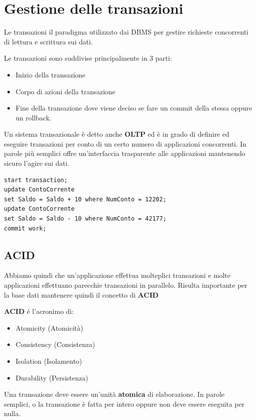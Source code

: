 \chapter{Gestione delle transazioni}

Le transazioni il paradigma utilizzato dai DBMS per gestire richieste concorrenti di lettura e scrittura sui dati.

Le transazioni sono suddivise principalmente in 3 parti:
\begin{itemize}
    \item Inizio della transazione
    \item Corpo di azioni della transazione
    \item Fine della transazione dove viene deciso se fare un commit della stessa oppure un rollback.
\end{itemize}

Un sistema transazionale è detto anche \textbf{OLTP} ed è in grado di definire ed eseguire transazioni per conto di un certo numero di applicazioni concorrenti. In parole più semplici offre un'interfaccia trasparente alle applicazioni mantenendo sicuro l'agire sui dati.

\begin{lstlisting}
start transaction;
update ContoCorrente
set Saldo = Saldo + 10 where NumConto = 12202;
update ContoCorrente
set Saldo = Saldo - 10 where NumConto = 42177;
commit work;
\end{lstlisting}

\section{ACID}

Abbiamo quindi che un'applicazione effettua molteplici transazioni e molte applicazioni effettuano parecchie transazioni in parallelo. Risulta importante per la base dati mantenere quindi il concetto di \textbf{ACID}

\textbf{ACID} é l'acronimo di:
\begin{itemize}
    \item Atomicity (Atomicità)
    \item Consistency (Consistenza)
    \item Isolation (Isolamento)
    \item Durability (Persistenza)
\end{itemize} 

Una transazione deve essere un'unità \textbf{atomica} di elaborazione. In parole semplici, o la transazione è fatta per intero oppure non deve essere eseguita per nulla.

